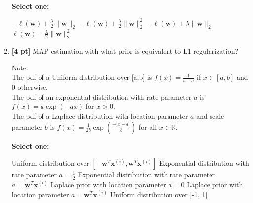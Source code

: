 \documentclass[12pt,addpoints,answers]{exam}
\begin{document}
\begin{enumerate}
    \textbf{Select one:}
    \begin{checkboxes}
        \choice $- \ell(\mathbf{w}) + \frac{\lambda}{2}\|\mathbf{w}\|_2$
        \choice $- \ell(\mathbf{w}) + \frac{\lambda}{2}\|\mathbf{w}\|_2^2$
        \choice $- \ell(\mathbf{w}) + \lambda\|\mathbf{w}\|_2$
        \choice $\ell(\mathbf{w}) - \frac{\lambda}{2}\|\mathbf{w}\|_2^2$
    \end{checkboxes}
    
    
    \item \textbf{[4 pt]} MAP estimation with what prior is equivalent to L1 regularization? 

    Note:\\
    The pdf of a Uniform distribution over [a,b] is $f(x) = \frac{1}{b-a}$ if $x \in [a,b]$ and 0 otherwise.\\
    The pdf of an exponential distribution with rate parameter $a$ is $f(x) = a \exp(-a x)$ for $x > 0$.\\
    The pdf of a Laplace distribution with location parameter $a$ and scale parameter $b$  is $f(x) = \frac{1}{2b} \exp \left( \frac{- |x - a| }{b} \right)$ for all $x \in \mathbb{R}$.
    

    \textbf{Select one:}
    \begin{checkboxes}
        \choice Uniform distribution over $[- \mathbf{w}^T\mathbf{x}^{(i)}, \mathbf{w}^T\mathbf{x}^{(i)} ]$
        \choice Exponential distribution with rate parameter $a = \frac{1}{2}$
        \choice Exponential distribution with rate parameter $a = \mathbf{w}^T \mathbf{x}^{(i)}$
        \choice Laplace prior with location parameter $a = 0$
        \choice Laplace prior with location parameter $a = \mathbf{w}^T \mathbf{x}^{(i)}$
        \choice Uniform distribution over [-1, 1]
    \end{checkboxes}
    
\end{enumerate}

\clearpage
\end{document}
